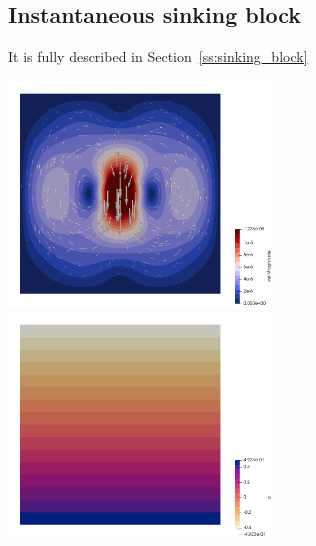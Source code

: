 \subsection*{Instantaneous sinking block}

It is fully described in Section~\ref{ss:sinking_block}

\begin{center}
\includegraphics[width=7cm]{python_codes/fieldstone_76/results/block/vel}
\includegraphics[width=7cm]{python_codes/fieldstone_76/results/block/press}
\end{center}



